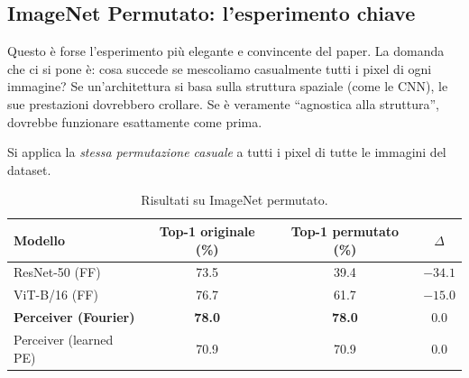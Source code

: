\documentclass[12pt,a4paper]{article}
\begin{document}
\subsection{ImageNet Permutato: l'esperimento chiave} \label{sec:imagenet_perm}

Questo \`e forse l'esperimento pi\`u elegante e convincente del paper. La domanda che ci si pone \`e: cosa succede se mescoliamo casualmente tutti i pixel di ogni immagine? Se un'architettura si basa sulla struttura spaziale (come le CNN), le sue prestazioni dovrebbero crollare. Se \`e veramente ``agnostica alla struttura'', dovrebbe funzionare esattamente come prima.

Si applica la \emph{stessa permutazione casuale} a tutti i pixel di tutte le immagini del dataset.

\begin{table}[htbp]
\centering
\caption{Risultati su ImageNet permutato.}
\begin{tabular}{@{}lccc@{}}
\toprule
\textbf{Modello} & \textbf{Top-1 originale (\%)} & \textbf{Top-1 permutato (\%)} & \textbf{$\Delta$} \\
\midrule
ResNet-50 (FF) & 73.5 & 39.4 & $-34.1$ \\
ViT-B/16 (FF) & 76.7 & 61.7 & $-15.0$ \\
\textbf{Perceiver (Fourier)} & \textbf{78.0} & \textbf{78.0} & $\mathbf{0.0}$ \\
Perceiver (learned PE) & 70.9 & 70.9 & $0.0$ \\
\bottomrule
\end{tabular}
\end{table}
\end{document}
